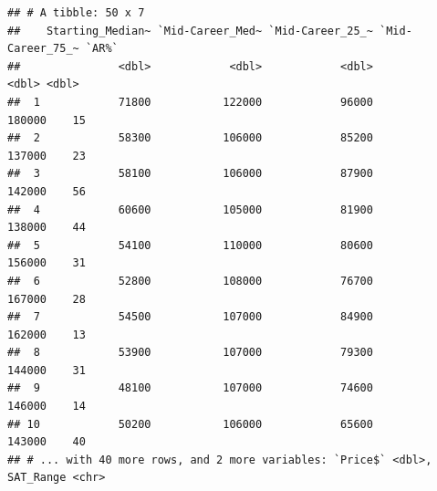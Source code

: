 \documentclass[]{article}
\newenvironment{Shaded}{\begin{snugshade}}{\end{snugshade}}
\newcommand{\KeywordTok}[1]{\textcolor[rgb]{0.13,0.29,0.53}{\textbf{#1}}}
\newcommand{\DataTypeTok}[1]{\textcolor[rgb]{0.13,0.29,0.53}{#1}}
\newcommand{\StringTok}[1]{\textcolor[rgb]{0.31,0.60,0.02}{#1}}
\newcommand{\CommentTok}[1]{\textcolor[rgb]{0.56,0.35,0.01}{\textit{#1}}}
\newcommand{\OperatorTok}[1]{\textcolor[rgb]{0.81,0.36,0.00}{\textbf{#1}}}
\newcommand{\NormalTok}[1]{#1}
\begin{document}
\begin{Shaded}
\end{Shaded}

\begin{verbatim}
## # A tibble: 50 x 7
##    Starting_Median~ `Mid-Career_Med~ `Mid-Career_25_~ `Mid-Career_75_~ `AR%`
##               <dbl>            <dbl>            <dbl>            <dbl> <dbl>
##  1            71800           122000            96000           180000    15
##  2            58300           106000            85200           137000    23
##  3            58100           106000            87900           142000    56
##  4            60600           105000            81900           138000    44
##  5            54100           110000            80600           156000    31
##  6            52800           108000            76700           167000    28
##  7            54500           107000            84900           162000    13
##  8            53900           107000            79300           144000    31
##  9            48100           107000            74600           146000    14
## 10            50200           106000            65600           143000    40
## # ... with 40 more rows, and 2 more variables: `Price$` <dbl>, SAT_Range <chr>
\end{verbatim}
\end{document}
